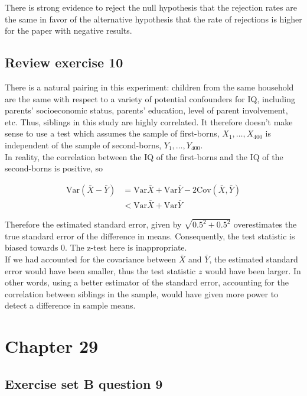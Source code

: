 \documentclass[11pt]{article}
\newcommand{\var}{\textrm{Var}}
\newcommand{\cov}{\textrm{Cov}}
\begin{document}
There is strong evidence to reject the null hypothesis that the rejection rates are the same in favor of the alternative hypothesis that the rate of rejections is higher for the paper with negative results.


\subsection*{Review exercise 10} %
There is a natural pairing in this experiment: children from the same household are the same with respect to a variety of potential confounders for IQ, including parents' socioeconomic status, parents' education, level of parent involvement, etc.  Thus, siblings in this study are highly correlated.  It therefore doesn't make sense to use a test which assumes the sample of first-borns, $X_1, \dots, X_{400}$ is independent of the sample of second-borns, $Y_1, \dots, Y_{400}$.  \\

In reality, the correlation between the IQ of the first-borns and the IQ of the second-borns is positive, so

\begin{align*}
\var(\bar{X} - \bar{Y}) &= \var{\bar{X}} + \var{\bar{Y}} - 2\cov(\bar{X},\bar{Y}) \\
&< \var{\bar{X}} + \var{\bar{Y}} 
\end{align*}

Therefore the estimated standard error, given by $\sqrt{0.5^2 + 0.5^2}$ overestimates the true standard error of the difference in means.  Consequently, the test statistic is biased towards $0$.  The z-test here is inappropriate. \\

If we had accounted for the covariance between $\bar{X}$ and $\bar{Y}$, the estimated standard error would have been smaller, thus the test statistic $z$ would have been larger.  In other words, using a better estimator of the standard error, accounting for the correlation between siblings in the sample, would have given more power to detect a difference in sample means.





\section*{Chapter 29}


\subsection*{Exercise set B question 9} %
\end{document}
